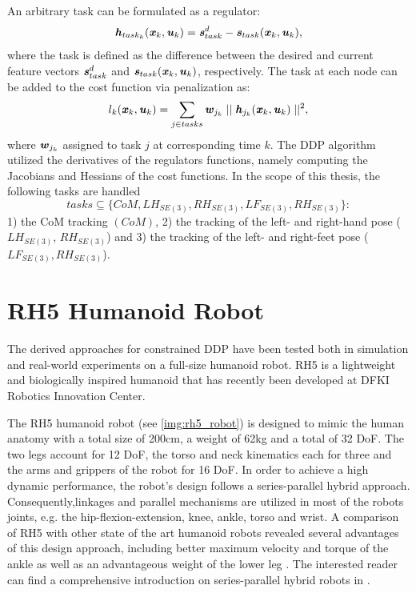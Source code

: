 An arbitrary task can be formulated as a regulator: 
\begin{equation*} 
\bm{\mathit{h}}_{task_k}(\bm{\mathit{x}}_k,\bm{\mathit{u}}_k)=\bm{\mathit{s}}_{task}^d-\bm{\mathit{s}}_{task}(\bm{\mathit{x}}_k,\bm{\mathit{u}}_k),
\end{equation*}   
where the task is defined as the difference between the desired and current feature vectors $\bm{\mathit{s}}_{task}^d$ and $\bm{\mathit{s}}_{task}(\bm{\mathit{x}}_k,\bm{\mathit{u}}_k)$, respectively. The task at each node can be added to the cost function via penalization as: 
\begin{equation*} 
l_k(\bm{\mathit{x}}_k,\bm{\mathit{u}}_k)=\sum_{j\in tasks}\bm{\mathit{w}}_{j_k}\mid\mid\bm{\mathit{h}}_{j_k}(\bm{\mathit{x}}_k,\bm{\mathit{u}}_k)\mid\mid^2,
\end{equation*}  
where $\bm{\mathit{w}}_{j_k}$ assigned to task $j$ at corresponding time $k$. The \gls{DDP} algorithm utilized the derivatives of the regulators functions, namely computing the Jacobians and Hessians of the cost functions. 
In the scope of this thesis, the following tasks are handled
\begin{equation}
tasks \subseteq \{CoM, LH_{SE(3)}, RH_{SE(3)}, LF_{SE(3)}, RH_{SE(3)}\}:
\end{equation}
1) the \gls{CoM} tracking $(CoM)$, 2) the tracking of the left- and right-hand pose ($LH_{SE(3)}$, $RH_{SE(3)}$) and 3) the tracking of the left- and right-feet pose ($LF_{SE(3)}, RH_{SE(3)}$).


\section{RH5 Humanoid Robot}
The derived approaches for constrained \gls{DDP} have been tested both in simulation and real-world experiments on a full-size humanoid robot. RH5 is a lightweight and biologically inspired humanoid that has recently been developed at DFKI Robotics Innovation Center\cite{peters2017konstruktion}.

The RH5 humanoid robot (see \cref{img:rh5_robot}) is designed to mimic the human anatomy with a total size of 200cm, a weight of 62kg and a total of 32 \gls{DoF}. The two legs account for 12 \gls{DoF}, the torso and neck kinematics each for three and the arms and grippers of the robot for 16 \gls{DoF}. In order to achieve a high dynamic performance, the robot's design follows a series-parallel hybrid approach. Consequently,linkages and parallel mechanisms are utilized in most of the robots joints, e.g. the hip-flexion-extension, knee, ankle, torso and wrist. A comparison of RH5 with other state of the art humanoid robots revealed several advantages of this design approach, including better maximum velocity and torque of the ankle as well as an advantageous weight of the lower leg \cite{kumar2020survey}. The interested reader can find a comprehensive introduction on series-parallel hybrid robots in \cite[Ch.2]{kumar2019modular}. 

